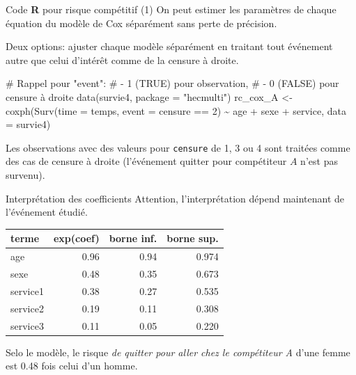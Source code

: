 \documentclass[
  ignorenonframetext,
]{beamer}
\newenvironment{Shaded}{\begin{snugshade}}{\end{snugshade}}
\newcommand{\AttributeTok}[1]{\textcolor[rgb]{0.40,0.45,0.13}{#1}}
\newcommand{\CommentTok}[1]{\textcolor[rgb]{0.37,0.37,0.37}{#1}}
\newcommand{\DecValTok}[1]{\textcolor[rgb]{0.68,0.00,0.00}{#1}}
\newcommand{\FunctionTok}[1]{\textcolor[rgb]{0.28,0.35,0.67}{#1}}
\newcommand{\NormalTok}[1]{\textcolor[rgb]{0.00,0.23,0.31}{#1}}
\newcommand{\OtherTok}[1]{\textcolor[rgb]{0.00,0.23,0.31}{#1}}
\newcommand{\SpecialCharTok}[1]{\textcolor[rgb]{0.37,0.37,0.37}{#1}}
\newcommand{\StringTok}[1]{\textcolor[rgb]{0.13,0.47,0.30}{#1}}
\begin{document}
\begin{frame}[fragile]{Code \textbf{R} pour risque compétitif (1)}
\protect\hypertarget{code-r-pour-risque-compuxe9titif-1}{}
On peut estimer les paramètres de chaque équation du modèle de Cox
séparément sans perte de précision.

Deux options: ajuster chaque modèle séparément en traitant tout
événement autre que celui d'intérêt comme de la censure à droite.

\begin{Shaded}
\begin{Highlighting}[numbers=left,,]
\CommentTok{\# Rappel pour "event":}
\CommentTok{\#  {-} 1 (TRUE) pour observation, }
\CommentTok{\#  {-} 0 (FALSE) pour censure à droite}
\FunctionTok{data}\NormalTok{(survie4, }\AttributeTok{package =} \StringTok{"hecmulti"}\NormalTok{)}
\NormalTok{rc\_cox\_A }\OtherTok{\textless{}{-}} \FunctionTok{coxph}\NormalTok{(}\FunctionTok{Surv}\NormalTok{(}\AttributeTok{time =}\NormalTok{ temps, }
                   \AttributeTok{event =}\NormalTok{ censure }\SpecialCharTok{==} \DecValTok{2}\NormalTok{) }\SpecialCharTok{\textasciitilde{}} 
\NormalTok{                age }\SpecialCharTok{+}\NormalTok{ sexe }\SpecialCharTok{+}\NormalTok{ service, }
              \AttributeTok{data =}\NormalTok{ survie4)}
\end{Highlighting}
\end{Shaded}

\footnotesize

Les observations avec des valeurs pour \texttt{censure} de 1, 3 ou 4
sont traitées comme des cas de censure à droite (l'événement quitter
pour compétiteur \(A\) n'est pas survenu).

\normalsize
\end{frame}

\begin{frame}{Interprétation des coefficients}
\protect\hypertarget{interpruxe9tation-des-coefficients}{}
Attention, l'interprétation dépend maintenant de l'événement étudié.

\begin{table}
\centering
\begin{tabular}{lrrr}
\toprule
terme & exp(coef) & borne inf. & borne sup.\\
\midrule
age & 0.96 & 0.94 & 0.974\\
sexe & 0.48 & 0.35 & 0.673\\
service1 & 0.38 & 0.27 & 0.535\\
service2 & 0.19 & 0.11 & 0.308\\
service3 & 0.11 & 0.05 & 0.220\\
\bottomrule
\end{tabular}
\end{table}

Selo le modèle, le risque \emph{de quitter pour aller chez le
compétiteur A} d'une femme est 0.48 fois celui d'un homme.
\end{frame}
\end{document}
